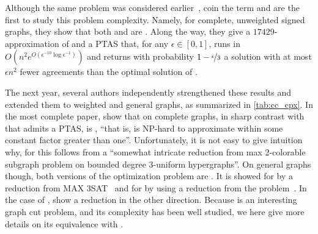 Although the same problem was considered earlier~\autocites{Early96}{Ben-Dor99}, \textcite{Bansal2002}
coin the term \pcc{} and are the first to study this problem complexity. Namely, for complete,
unweighted signed graphs, they show that both \mind{} and \maxa{} are \NPc{}. Along the way, they
give a $17429$-approximation of \mind{} and a PTAS%
that, for any $\epsilon \in [0,1]$, runs in
$O(n^2e^{O(\epsilon^{-10}\log \epsilon^{-1})})$ and returns with probability
$1-\nicefrac{\epsilon}{3}$ a solution with at most $\epsilon n^2$ fewer agreements than the optimal
solution of \maxa{}.

The next year, several authors independently strengthened these results and extended them to
weighted and general graphs, as summarized in \autoref{tab:cc_cpx}. In the most complete paper,
\textcite{Charikar2003} show that on complete graphs, in sharp contrast with \maxa{} that admits a
PTAS, \mind{} is \APXh{}, \enquote{that is, is NP-hard to approximate within some constant factor
greater than one}. Unfortunately, it is not easy to give intuition why, for this follows from a
\enquote{somewhat intricate reduction from max 2-colorable subgraph problem on bounded degree
3-uniform hypergraphs}. On general graphs though, both versions of the optimization problem are
\APXh{}. It is showed for \maxa{} by a reduction from MAX 3SAT~\autocite[Theorem 9]{Charikar2003}
and for \mind{} by using a reduction from the \mmc{} problem~\autocite[Theorem 8]{Charikar2003}. In
the case of \mind{}, \textcite{Emanuel2003} show a reduction in the other direction. Because \mmc{}
is an interesting graph cut problem, and its complexity has been well studied, we here give more
details on its equivalence with \pcc{}.


